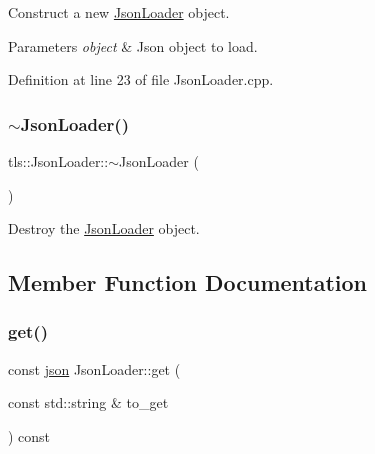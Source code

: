 Construct a new \hyperlink{classtls_1_1_json_loader}{Json\+Loader} object. 


\begin{DoxyParams}{Parameters}
{\em object} & Json object to load. \\
\hline
\end{DoxyParams}


Definition at line 23 of file Json\+Loader.\+cpp.

\mbox{\label{classtls_1_1_json_loader_a2d493a7049c70e6974a3daf2ef2e71f9}} 
\subsubsection{\texorpdfstring{$\sim$\+Json\+Loader()}{~JsonLoader()}}
{\footnotesize\ttfamily tls\+::\+Json\+Loader\+::$\sim$\+Json\+Loader (\begin{DoxyParamCaption}{ }\end{DoxyParamCaption})\hspace{0.3cm}{\ttfamily [default]}}



Destroy the \hyperlink{classtls_1_1_json_loader}{Json\+Loader} object. 



\subsection{Member Function Documentation}
\mbox{\label{classtls_1_1_json_loader_a0174b44e635a44811616c394d89b73e5}} 
\subsubsection{\texorpdfstring{get()}{get()}}
{\footnotesize\ttfamily const \hyperlink{namespacetls_a4e8d32383e204ee25990db65651ea712}{json} Json\+Loader\+::get (\begin{DoxyParamCaption}\item[{const std\+::string \&}]{to\+\_\+get }\end{DoxyParamCaption}) const}



